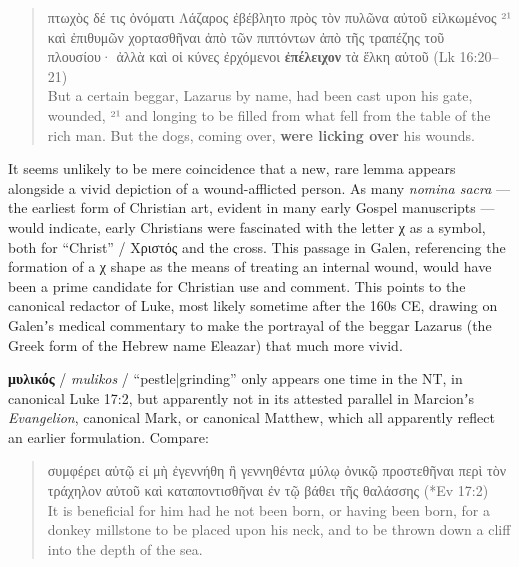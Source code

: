 \vspace*{2mm} 
 \begin{quote}πτωχὸς δέ τις ὀνόματι Λάζαρος ἐβέβλητο πρὸς τὸν πυλῶνα αὐτοῦ εἱλκωμένος %
 ²¹ καὶ ἐπιθυμῶν χορτασθῆναι ἀπὸ τῶν πιπτόντων ἀπὸ τῆς τραπέζης τοῦ πλουσίου· %
 ἀλλὰ καὶ οἱ κύνες ἐρχόμενοι \textbf{ἐπέλειχον} τὰ ἕλκη αὐτοῦ (Lk 16:20--21) \\[1mm] %
 But a certain beggar, Lazarus by name, %
 had been cast upon his gate, wounded, %
 ²¹ and longing to be filled from what fell from the table of the rich man. %
 But the dogs, coming over, \textbf{were licking over} his wounds. %
 \end{quote} %
 \vspace*{2mm}

It seems unlikely to be mere coincidence that a new, rare lemma %
appears alongside a vivid depiction of a wound-afflicted person. %
As many \textit{nomina sacra} --- the earliest form of Christian art, %
evident in many early Gospel manuscripts --- would indicate, %
early Christians were fascinated with the letter χ as a symbol, %
both for “Christ” / Χριστός and the cross. %
This passage in Galen, referencing the formation of a χ shape as the means of treating an internal wound, %
would have been a prime candidate for Christian use and comment. %
This points to the canonical redactor of Luke, most likely sometime after the 160s CE, %
drawing on Galenʼs medical commentary to make the portrayal of the beggar Lazarus %
(the Greek form of the Hebrew name Eleazar) that much more vivid. %
\clearpage

\noindent{}\textbf{μυλικός} / \textit{mulikos} / “pestle|grinding” only appears %
one time in the NT, in canonical Luke 17:2, %
but apparently not in its attested parallel in Marcionʼs \textit{Evangelion}, %
canonical Mark, or canonical Matthew, %
which all apparently reflect an earlier formulation. %
Compare:

\vspace*{2mm} 
 \begin{quote}συμφέρει αὐτῷ εἰ μὴ ἐγεννήθη %
    ἢ γεννηθέντα μύλῳ ὀνικῷ προστεθῆναι περὶ τὸν τράχηλον αὐτοῦ 
 καὶ καταποντισθῆναι ἐν τῷ βάθει τῆς θαλάσσης (*Ev 17:2) \\[1mm] %
It is beneficial for him had he not been born, or having been born, %
 for a donkey millstone to be placed upon his neck, %
 and to be thrown down a cliff into the depth of the sea. %
 \end{quote} %
 \vspace*{1mm}

